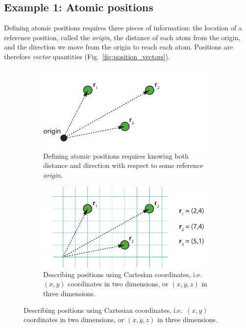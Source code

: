 \documentclass[a4paper]{article}
\begin{document}
\subsection{Example 1: Atomic positions}
Defining atomic positions requires three pieces of information: the location of a reference position, called the \emph{origin}, the distance of each atom from the origin, and the direction we move from the origin to reach each atom. Positions are therefore \emph{vector} quantities (Fig.~\ref{fig:position_vectors}).
\begin{figure}
  \centering
  \begin{subfigure}[t]{0.475\textwidth}
    \centering
    \includegraphics[width=\textwidth]{position_vectors_1}
    \caption[Network2]%
      {{\small Defining atomic positions requires knowing both distance and direction with respect to some reference \emph{origin}.}}    
    \label{fig:position_vectors_1}
  \end{subfigure}
  \hfill
  \begin{subfigure}[t]{0.475\textwidth}  
    \centering 
    \includegraphics[width=\textwidth]{position_vectors_2}
  \caption[]%
      {{\small Describing positions using Cartesian coordinates, i.e.\ $(x,y)$ coordinates in two dimensions, or $(x,y,z)$ in three dimensions.}}    
    \label{fig:position_vectors_2}

\end{subfigure}
\end{figure}
\end{document}
